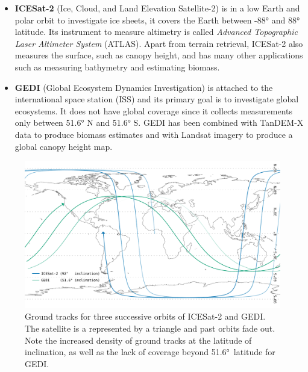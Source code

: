\begin{itemize}
  \item \textbf{ICESat-2}
        (Ice, Cloud, and Land Elevation Satellite-2) is in a low Earth and polar orbit to investigate ice sheets, it covers the Earth between \ang{-88} and \ang{88} latitude.
        Its instrument to measure altimetry is called \emph{Advanced Topographic Laser Altimeter System} (ATLAS).
        Apart from terrain retrieval, ICESat-2 also measures the surface, such as canopy height, and has many other applications such as measuring bathymetry and estimating biomass.
  \item \textbf{GEDI}
        (Global Ecosystem Dynamics Investigation) is attached to the international space station (ISS) and its primary goal is to investigate global ecosystems.
        It does not have global coverage since it collects measurements only between \ang{51.6} N and \ang{51.6} S.
        GEDI has been combined with TanDEM-X data to produce biomass estimates and with Landsat imagery to produce a global canopy height map.
\end{itemize}
\begin{figure}
  \centering
  \includegraphics[width=\linewidth]{orbit}
  \caption{Ground tracks for three successive orbits of ICESat-2 and GEDI\@. The satellite is a represented by a triangle and past orbits fade out. Note the increased density of ground tracks at the latitude of inclination, as well as the lack of coverage beyond \ang{51.6}~latitude for GEDI.}%
  \label{fig:orbit}
\end{figure}

%

